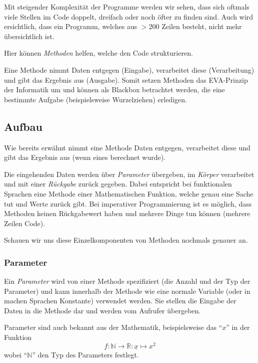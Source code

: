
Mit steigender Komplexität der Programme werden wir sehen, dass sich oftmals viele Stellen im Code doppelt, dreifach oder noch öfter zu finden sind. Auch wird ersichtlich, dass ein Programm, welches aus $ >200 $ Zeilen besteht, nicht mehr übersichtlich ist.

Hier können \textit{Methoden} helfen, welche den Code strukturieren.

Eine Methode nimmt Daten entgegen (Eingabe), verarbeitet diese (Verarbeitung) und gibt das Ergebnis aus (Ausgabe). Somit setzen Methoden das EVA-Prinzip der Informatik um und können als Blackbox betrachtet werden, die eine bestimmte Aufgabe (beispielsweise Wurzelziehen) erledigen.

\subsection{Aufbau} \functionalMark \imperativeMark \oopMark
	Wie bereits erwähnt nimmt eine Methode Daten entgegen, verarbeitet diese und gibt das Ergebnis aus (wenn eines berechnet wurde).
	
	Die eingehenden Daten werden über \textit{Parameter} übergeben, im \textit{Körper} verarbeitet und mit einer \textit{Rückgabe} zurück gegeben. Dabei entspricht bei funktionalen Sprachen eine Methode einer Mathematischen Funktion, welche genau eine Sache tut und Werte zurück gibt. Bei imperativer Programmierung ist es möglich, dass Methoden keinen Rückgabewert haben und mehrere Dinge tun können (mehrere Zeilen Code).
	
	Schauen wir uns diese Einzelkomponenten von Methoden nochmals genauer an.

	\subsubsection{Parameter} \functionalMark \imperativeMark \oopMark
		Ein \textit{Parameter} wird von einer Methode spezifiziert (die Anzahl und der Typ der Parameter) und kann innerhalb der Methode wie eine normale Variable (oder in machen Sprachen Konstante) verwendet werden. Sie stellen die Eingabe der Daten in die Methode dar und werden vom Aufrufer übergeben.
		
		Parameter sind auch bekannt aus der Mathematik, beispielsweise das \enquote{\(x\)} in der Funktion \[ f : \mathbb{N} \rightarrow \mathbb{R} : \underline{x} \mapsto x ^ 2 \] wobei \enquote{\(\mathbb{N}\)} den Typ des Parameters festlegt.
		
